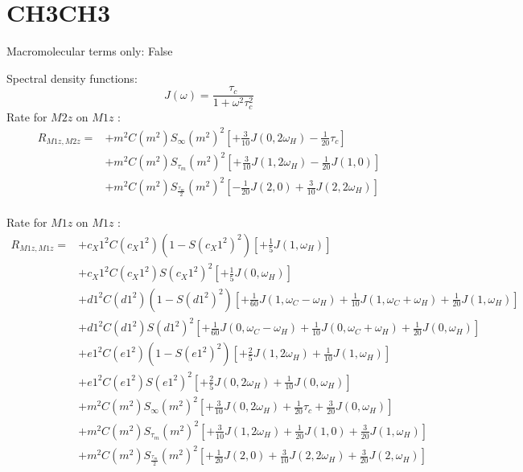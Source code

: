 \documentclass[showkeys,aps,prb,prepreint,amssymb, amsmath,nobibnotes]{revtex4}
\begin{document}
\section{CH3CH3}
Macromolecular terms only:  False

Spectral density functions: $$J\left(\omega\right)=\frac{\tau_c}{1+\omega^2\tau_c^2}  $$    
Rate for $M2z$ on $M1z$ :
\begin{equation}\begin{array}{rl}
R_{M1z,M2z}=
& + m^2C(m^2)S_{\infty}(m^2)^2 \left[ +\frac{3}{10} J\left(0,2\omega_H\right) -\frac{1}{20} \tau_c\right]\\
& + m^2C(m^2)S_{\tau_{m}}(m^2)^2 \left[ +\frac{3}{10} J\left(1,2\omega_H\right) -\frac{1}{20} J\left(1,0\right)\right]\\
& + m^2C(m^2)S_{\frac{\tau_{m}}{2}}(m^2)^2 \left[ -\frac{1}{20} J\left(2,0\right) +\frac{3}{10} J\left(2,2\omega_H\right)\right]\\
\end{array}\end{equation}

Rate for $M1z$ on $M1z$ :
\begin{equation}\begin{array}{rl}
R_{M1z,M1z}=
& + c_X1^2C(c_X1^2)(1-S(c_X1^2)^2) \left[ +\frac{1}{5} J\left(1,\omega_H\right)\right]\\
& + c_X1^2C(c_X1^2)S(c_X1^2)^2 \left[ +\frac{1}{5} J\left(0,\omega_H\right)\right]\\
& + d1^2C(d1^2)(1-S(d1^2)^2) \left[ +\frac{1}{60} J\left(1,\omega_C-\omega_H\right) +\frac{1}{10} J\left(1,\omega_C+\omega_H\right) +\frac{1}{20} J\left(1,\omega_H\right)\right]\\
& + d1^2C(d1^2)S(d1^2)^2 \left[ +\frac{1}{60} J\left(0,\omega_C-\omega_H\right) +\frac{1}{10} J\left(0,\omega_C+\omega_H\right) +\frac{1}{20} J\left(0,\omega_H\right)\right]\\
& + e1^2C(e1^2)(1-S(e1^2)^2) \left[ +\frac{2}{5} J\left(1,2\omega_H\right) +\frac{1}{10} J\left(1,\omega_H\right)\right]\\
& + e1^2C(e1^2)S(e1^2)^2 \left[ +\frac{2}{5} J\left(0,2\omega_H\right) +\frac{1}{10} J\left(0,\omega_H\right)\right]\\
& + m^2C(m^2)S_{\infty}(m^2)^2 \left[ +\frac{3}{10} J\left(0,2\omega_H\right) +\frac{1}{20} \tau_c +\frac{3}{20} J\left(0,\omega_H\right)\right]\\
& + m^2C(m^2)S_{\tau_{m}}(m^2)^2 \left[ +\frac{3}{10} J\left(1,2\omega_H\right) +\frac{1}{20} J\left(1,0\right) +\frac{3}{20} J\left(1,\omega_H\right)\right]\\
& + m^2C(m^2)S_{\frac{\tau_{m}}{2}}(m^2)^2 \left[ +\frac{1}{20} J\left(2,0\right) +\frac{3}{10} J\left(2,2\omega_H\right) +\frac{3}{20} J\left(2,\omega_H\right)\right]\\
\end{array}\end{equation}
\end{document}
